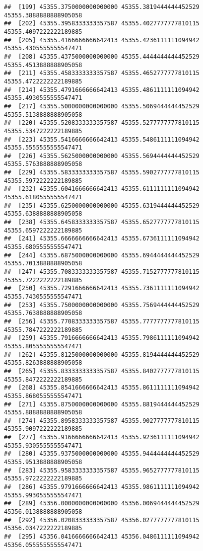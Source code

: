 \documentclass[
]{article}
\begin{document}
\begin{verbatim}
##  [199] 45355.3750000000000000 45355.3819444444452529 45355.3888888888905058
##  [202] 45355.3958333333357587 45355.4027777777810115 45355.4097222222189885
##  [205] 45355.4166666666642413 45355.4236111111094942 45355.4305555555547471
##  [208] 45355.4375000000000000 45355.4444444444452529 45355.4513888888905058
##  [211] 45355.4583333333357587 45355.4652777777810115 45355.4722222222189885
##  [214] 45355.4791666666642413 45355.4861111111094942 45355.4930555555547471
##  [217] 45355.5000000000000000 45355.5069444444452529 45355.5138888888905058
##  [220] 45355.5208333333357587 45355.5277777777810115 45355.5347222222189885
##  [223] 45355.5416666666642413 45355.5486111111094942 45355.5555555555547471
##  [226] 45355.5625000000000000 45355.5694444444452529 45355.5763888888905058
##  [229] 45355.5833333333357587 45355.5902777777810115 45355.5972222222189885
##  [232] 45355.6041666666642413 45355.6111111111094942 45355.6180555555547471
##  [235] 45355.6250000000000000 45355.6319444444452529 45355.6388888888905058
##  [238] 45355.6458333333357587 45355.6527777777810115 45355.6597222222189885
##  [241] 45355.6666666666642413 45355.6736111111094942 45355.6805555555547471
##  [244] 45355.6875000000000000 45355.6944444444452529 45355.7013888888905058
##  [247] 45355.7083333333357587 45355.7152777777810115 45355.7222222222189885
##  [250] 45355.7291666666642413 45355.7361111111094942 45355.7430555555547471
##  [253] 45355.7500000000000000 45355.7569444444452529 45355.7638888888905058
##  [256] 45355.7708333333357587 45355.7777777777810115 45355.7847222222189885
##  [259] 45355.7916666666642413 45355.7986111111094942 45355.8055555555547471
##  [262] 45355.8125000000000000 45355.8194444444452529 45355.8263888888905058
##  [265] 45355.8333333333357587 45355.8402777777810115 45355.8472222222189885
##  [268] 45355.8541666666642413 45355.8611111111094942 45355.8680555555547471
##  [271] 45355.8750000000000000 45355.8819444444452529 45355.8888888888905058
##  [274] 45355.8958333333357587 45355.9027777777810115 45355.9097222222189885
##  [277] 45355.9166666666642413 45355.9236111111094942 45355.9305555555547471
##  [280] 45355.9375000000000000 45355.9444444444452529 45355.9513888888905058
##  [283] 45355.9583333333357587 45355.9652777777810115 45355.9722222222189885
##  [286] 45355.9791666666642413 45355.9861111111094942 45355.9930555555547471
##  [289] 45356.0000000000000000 45356.0069444444452529 45356.0138888888905058
##  [292] 45356.0208333333357587 45356.0277777777810115 45356.0347222222189885
##  [295] 45356.0416666666642413 45356.0486111111094942 45356.0555555555547471

\end{verbatim}
\end{document}
